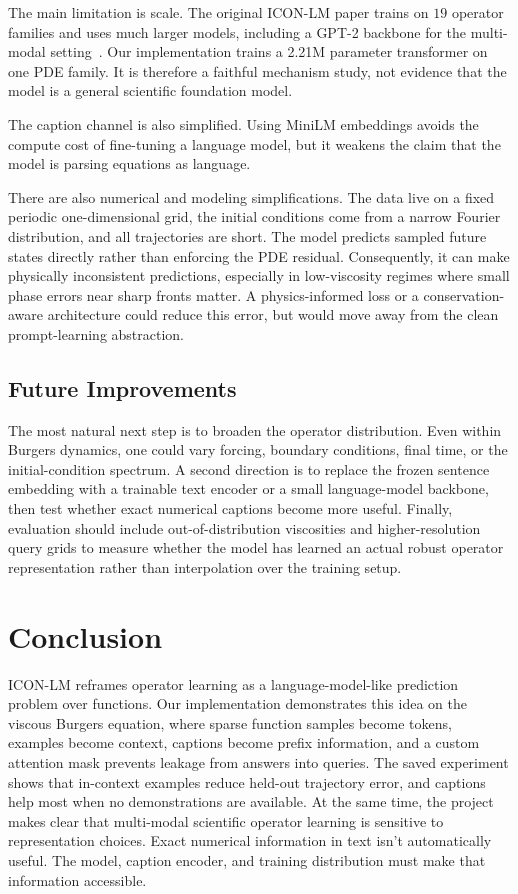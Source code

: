 \documentclass[11pt]{article}
\begin{document}
The main limitation is scale. The original ICON-LM paper trains on $19$ operator
families and uses much larger models, including a GPT-2 backbone for the
multi-modal setting~\citep{yang2024icon_lm}. Our implementation trains a 2.21M
parameter transformer on one PDE family. It is therefore a faithful mechanism
study, not evidence that the model is a general scientific foundation model.

The caption channel is also simplified. Using MiniLM embeddings avoids the compute
cost of fine-tuning a language model, but it weakens the claim that the model is
parsing equations as language.

There are also numerical and modeling simplifications. The data live on a fixed
periodic one-dimensional grid, the initial conditions come from a narrow Fourier
distribution, and all trajectories are short. The model predicts sampled future
states directly rather than enforcing the PDE residual. Consequently, it can make
physically inconsistent predictions, especially in low-viscosity regimes where
small phase errors near sharp fronts matter. A physics-informed loss or a
conservation-aware architecture could reduce this error, but would move away from
the clean prompt-learning abstraction.

\subsection{Future Improvements}

The most natural next step is to broaden the operator distribution. Even within
Burgers dynamics, one could vary forcing, boundary conditions, final time, or the
initial-condition spectrum. A second direction is to replace the frozen sentence
embedding with a trainable text encoder or a small language-model backbone, then
test whether exact numerical captions become more useful. Finally, evaluation
should include out-of-distribution viscosities and higher-resolution query grids
to measure whether the model has learned an actual robust operator representation rather
than interpolation over the training setup.

\section{Conclusion}
\label{sec:conclusion}

ICON-LM reframes operator learning as a language-model-like prediction problem
over functions. Our implementation demonstrates this idea on the viscous Burgers
equation, where sparse function samples become tokens, examples become context, captions
become prefix information, and a custom attention mask prevents leakage from
answers into queries. The saved experiment shows that in-context examples reduce
held-out trajectory error, and captions help most when no demonstrations are
available. At the same time, the project makes clear that multi-modal scientific
operator learning is sensitive to representation choices. Exact numerical
information in text isn't automatically useful. The model, caption encoder, and
training distribution must make that information accessible.
\end{document}

